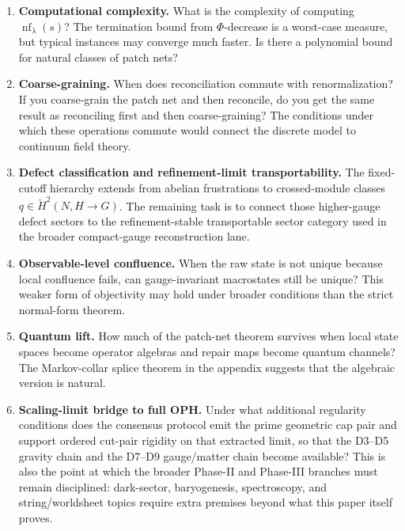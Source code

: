 \documentclass[11pt]{article}
\theoremstyle{remark}
\theoremstyle{plain}
\begin{document}
\begin{enumerate}
\item \textbf{Computational complexity.} What is the complexity of computing $\operatorname{nf}_\lambda(s)$? The termination bound from $\Phi$-decrease is a worst-case measure, but typical instances may converge much faster. Is there a polynomial bound for natural classes of patch nets?

\item \textbf{Coarse-graining.} When does reconciliation commute with renormalization? If you coarse-grain the patch net and then reconcile, do you get the same result as reconciling first and then coarse-graining? The conditions under which these operations commute would connect the discrete model to continuum field theory.

\item \textbf{Defect classification and refinement-limit transportability.} The fixed-cutoff hierarchy extends from abelian frustrations to crossed-module classes \(q\in \check H^2(N,H\to G)\). The remaining task is to connect those higher-gauge defect sectors to the refinement-stable transportable sector category used in the broader compact-gauge reconstruction lane.

\item \textbf{Observable-level confluence.} When the raw state is not unique because local confluence fails, can gauge-invariant macrostates still be unique? This weaker form of objectivity may hold under broader conditions than the strict normal-form theorem.

\item \textbf{Quantum lift.} How much of the patch-net theorem survives when local state spaces become operator algebras and repair maps become quantum channels? The Markov-collar splice theorem in the appendix suggests that the algebraic version is natural.

\item \textbf{Scaling-limit bridge to full OPH.} Under what additional regularity conditions does the consensus protocol emit the prime geometric cap pair and support ordered cut-pair rigidity on that extracted limit, so that the D3--D5 gravity chain and the D7--D9 gauge/matter chain become available? This is also the point at which the broader Phase-II and Phase-III branches must remain disciplined: dark-sector, baryogenesis, spectroscopy, and string/worldsheet topics require extra premises beyond what this paper itself proves.
\end{enumerate}
\end{document}
